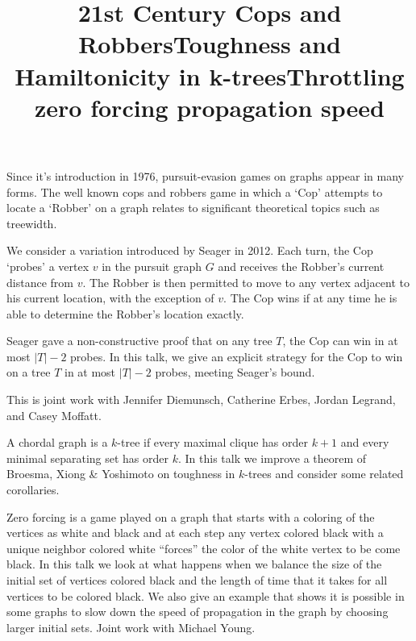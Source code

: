 \documentclass{article}
\begin{document}
\vspace{.25in}

\title{ 21st Century Cops and Robbers}
\endtitle
Since it's introduction in 1976, pursuit-evasion games on graphs appear in many forms. The well known cops and robbers game in which a `Cop' attempts to locate a `Robber' on a graph relates to significant theoretical topics such as treewidth.

We consider a variation introduced by Seager in 2012. Each turn, the Cop `probes' a vertex $v$ in the pursuit graph $G$ and receives the Robber's current distance from $v$. The Robber is then permitted to move to any vertex adjacent to his current location, with the exception of $v$. The Cop wins if at any time he is able to determine the Robber's location exactly.

Seager gave a non-constructive proof that on any tree $T$, the Cop can win in at most $|T|-2$ probes. In this talk, we give an explicit strategy for the Cop to win on a tree $T$ in at most $|T|-2$ probes, meeting Seager's bound.

This is joint work with Jennifer Diemunsch, Catherine Erbes, Jordan Legrand, and Casey Moffatt.

\vspace{.25in}

\title{Toughness and Hamiltonicity in k-trees}
\endtitle
A chordal graph is a $k$-tree if every maximal clique has order
$k+1$ and every minimal separating set has order $k$.  In this talk we
improve a theorem of Broesma, Xiong \& Yoshimoto on toughness in $k$-trees
and consider some related corollaries. 

\vspace{.25in}

\title{Throttling zero forcing propagation speed}
\endtitle
Zero forcing is a game played on a graph that starts with a
coloring of the vertices as white and black and at each step any vertex
colored black with a unique neighbor colored white ``forces'' the color of
the white vertex to be come black.  In this talk we look at what happens
when we balance the size of the initial set of vertices colored black and
the length of time that it takes for all vertices to be colored black.  We
also give an example that shows it is possible in some graphs to slow down
the speed of propagation in the graph by choosing larger initial sets.
Joint work with Michael Young.
\end{document}
